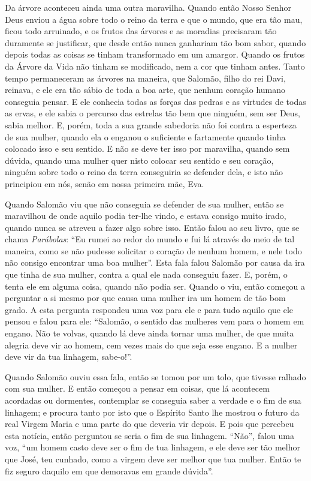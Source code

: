 Da árvore aconteceu ainda uma outra maravilha. Quando então Nosso Senhor Deus
enviou a água sobre todo o reino da terra e que o mundo, que era tão mau, ficou
todo arruinado, e os frutos das árvores e as moradias precisaram tão duramente
se justificar, que desde então nunca ganhariam tão bom sabor, quando depois
todas as coisas se tinham transformado em um amargor. Quando os frutos da
Árvore da Vida não tinham se modificado, nem a cor que tinham antes. Tanto
tempo permaneceram as árvores na maneira, que Salomão, filho do rei Davi,
reinava, e ele era tão sábio de toda a boa arte, que nenhum coração humano
conseguia pensar. E ele conhecia todas as forças das pedras e as virtudes de
todas as ervas, e ele sabia o percurso das estrelas tão bem que ninguém, sem
ser Deus, sabia melhor. E, porém, toda a sua grande sabedoria não foi contra a
esperteza de sua mulher, quando ela o enganou o suficiente e fartamente quando
tinha colocado isso e seu sentido. E não se deve ter isso por maravilha, quando
sem dúvida, quando uma mulher quer nisto colocar seu sentido e seu coração,
ninguém sobre todo o reino da terra conseguiria se defender dela, e isto não
principiou em nós, senão em nossa primeira mãe, Eva. 

Quando Salomão viu que não conseguia se defender de sua mulher, então se
maravilhou de onde aquilo podia ter-lhe vindo, e estava consigo muito irado,
quando nunca se atreveu a fazer algo sobre isso. Então falou ao seu livro, que
se chama \textit{Parábolas}: “Eu rumei ao redor do mundo e fui lá através do
meio de tal maneira, como se não pudesse solicitar o coração de nenhum homem, e
nele todo não consigo encontrar uma boa mulher”. Esta fala falou Salomão por
causa da ira que tinha de sua mulher, contra a qual ele nada conseguiu fazer.
E, porém, o tenta ele em alguma coisa, quando não podia ser. Quando o viu,
então começou a perguntar a si mesmo por que causa uma mulher ira um homem de
tão bom grado. A esta pergunta respondeu uma voz para ele e para tudo aquilo
que ele pensou e falou para ele: “Salomão, o sentido das mulheres vem para o
homem em engano. Não te volvas, quando lá deve ainda tornar uma mulher, de que
muita alegria deve vir ao homem, cem vezes mais do que seja esse engano. E a
mulher deve vir da tua linhagem, sabe-o!”. 

Quando Salomão ouviu essa fala, então se tomou por um tolo, que tivesse ralhado
com sua mulher. E então começou a pensar em coisas, que lá acontecem acordadas
ou dormentes, contemplar se conseguia saber a verdade e o fim de sua linhagem;
e procura tanto por isto que o Espírito Santo lhe mostrou o futuro da real
Virgem Maria e uma parte do que deveria vir depois. E pois que percebeu esta
notícia, então perguntou se seria o fim de sua linhagem. “Não”, falou uma voz,
“um homem casto deve ser o fim de tua linhagem, e ele deve ser tão melhor que
José, teu cunhado, como a virgem deve ser melhor que tua mulher. Então te fiz
seguro daquilo em que demoravas em grande dúvida”. 

